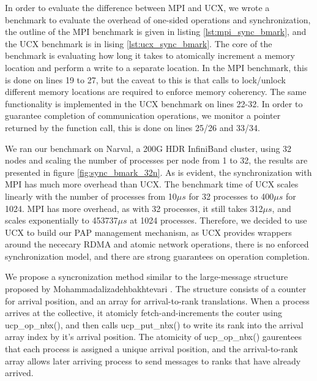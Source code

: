 In order to evaluate the difference between MPI and UCX, we wrote a benchmark to evaluate the overhead of one-sided operations and synchronization, the outline of the MPI benchmark is given in listing \ref{lst:mpi_sync_bmark}, and the UCX benchmark is in lising \ref{lst:ucx_sync_bmark}.
The core of the benchmark is evaluating how long it takes to atomically increment a memory location and perform a write to a separate location.
In the MPI benchmark, this is done on lines 19 to 27, but the caveat to this is that calls to lock/unlock different memory locations are required to enforce memory coherency.
The same functionality is implemented in the UCX benchmark on lines 22-32.
In order to guarantee completion of communication operations, we monitor a pointer returned by the function call, this is done on lines 25/26 and 33/34.

We ran our benchmark on Narval, a 200G HDR InfiniBand cluster, using 32 nodes and scaling the number of processes per node from 1 to 32, the results are presented in figure \ref{fig:sync_bmark_32n}.
As is evident, the synchronization with MPI has much more overhead than UCX.
The benchmark time of UCX scales linearly with the number of processes from 10$\mu s$ for 32 processes to 400$\mu s$ for 1024.
MPI has more overhead, as with 32 processes, it still takes 312$\mu s$, and scales exponentially to 453737$\mu s$ at 1024 processes.
Therefore, we decided to use UCX to build our PAP management mechanism, as UCX provides wrappers around the nececary RDMA and atomic network operations, there is no enforced synchronization model, and there are strong guarantees on operation completion. 

We propose a syncronization method similar to the large-message structure proposed by Mohammadalizadehbakhtevari \cite{Mohammadalizadehbakhtevari2021Thesis}.
The structure consists of a counter for arrival position, and an array for arrival-to-rank translations.
When a process arrives at the collective, it atomicly fetch-and-increments the couter using ucp\_op\_nbx(), and then calls ucp\_put\_nbx() to write its rank into the arrival array index by it's arrival position.
The atomicity of ucp\_op\_nbx() gaurentees that each process is assigned a unique arrival position, and the arrival-to-rank array allows later arriving process to send messages to ranks that have already arrived.

\lstset{style = bklstc}
\lstset{label = lst:mpi_sync_bmark}
\lstset{caption = Benchmark to evaluate the overhead of MPI for one-sided operations}


